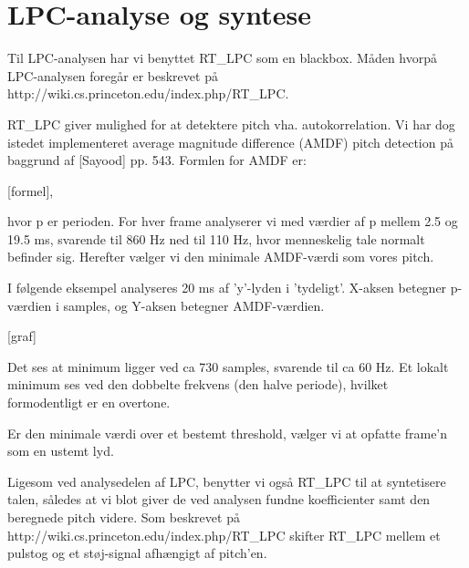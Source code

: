 \section{LPC-analyse og syntese}
Til LPC-analysen har vi benyttet RT_LPC som en blackbox. Måden hvorpå LPC-analysen foregår er beskrevet på http://wiki.cs.princeton.edu/index.php/RT_LPC.

RT_LPC giver mulighed for at detektere pitch vha. autokorrelation. Vi har dog istedet implementeret average magnitude difference (AMDF) pitch detection på baggrund af [Sayood] pp. 543. Formlen for AMDF er:

[formel],

hvor p er perioden. For hver frame analyserer vi med værdier af p mellem 2.5 og 19.5 ms, svarende til 860 Hz ned til 110 Hz, hvor menneskelig tale normalt befinder sig. Herefter vælger vi den minimale AMDF-værdi som vores pitch.

I følgende eksempel analyseres 20 ms af 'y'-lyden i 'tydeligt'. X-aksen betegner p-værdien i samples, og Y-aksen betegner AMDF-værdien.

[graf]

Det ses at minimum ligger ved ca 730 samples, svarende til ca 60 Hz. Et lokalt minimum ses ved den dobbelte frekvens (den halve periode), hvilket formodentligt er en overtone.

Er den minimale værdi over et bestemt threshold, vælger vi at opfatte frame'n som en ustemt lyd.

Ligesom ved analysedelen af LPC, benytter vi også RT_LPC til at syntetisere talen, således at vi blot giver de ved analysen fundne koefficienter samt den beregnede pitch videre. Som beskrevet på http://wiki.cs.princeton.edu/index.php/RT_LPC skifter RT_LPC mellem et pulstog og et støj-signal afhængigt af pitch'en.


